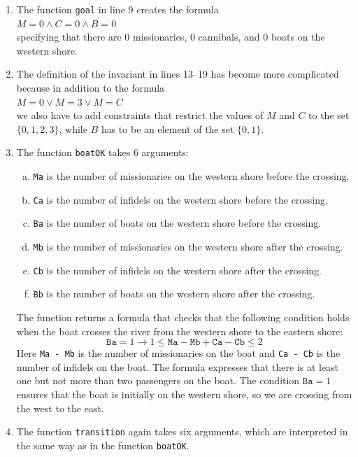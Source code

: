 \begin{enumerate}
      Note that we have to use the \texttt{Z3} function \texttt{And} to form the conjunction of the conditions.
      The function takes an arbitrary number of arguments.  The constraint solver \texttt{Z3} also provides the
      functions \texttt{Or} and \texttt{Implies}.  The function \texttt{Or} computes the disjunction of its
      arguments, while the function $\texttt{Implies}(A, B)$ represents the formula $A \rightarrow B$.
\item The function \texttt{goal} in line 9 creates the formula
      \\[0.2cm]
      \hspace*{1.3cm}
      $M = 0 \wedge C = 0 \wedge B = 0$
      \\[0.2cm]
      specifying that there are 0 missionaries, 0 cannibals, and 0 boats on the western shore.
\item The definition of the invariant in lines 13--19 has become more complicated because in addition to the
      formula 
      \\[0.2cm]
      \hspace*{1.3cm}
      $M = 0 \vee M = 3 \vee M = C$
      \\[0.2cm]
      we also have to add constraints that restrict the values of $M$ and $C$ to the set $\{0, 1, 2, 3\}$,
      while $B$ has to be an element of the set $\{0,1\}$.
\item The function \texttt{boatOK} takes 6 arguments:
      \begin{enumerate}[(a)]
      \item \texttt{Ma} is the number of missionaries on the western shore before the crossing.
      \item \texttt{Ca} is the number of infidels on the western shore before the crossing.
      \item \texttt{Ba} is the number of boats on the western shore before the crossing. 
      \item \texttt{Mb} is the number of missionaries on the western shore after the crossing.
      \item \texttt{Cb} is the number of infidels on the western shore after the crossing.
      \item \texttt{Bb} is the number of boats on the western shore after the crossing.
      \end{enumerate}

      The function returns a formula that checks that the following condition holds when the boat 
      crosses the river from the western shore to the eastern shore:
      $$ \mathtt{Ba} = 1 \rightarrow 1 \leq \mathtt{Ma} - \mathtt{Mb} + \mathtt{Ca} - \mathtt{Cb} \leq 2 $$
      Here \texttt{Ma - Mb} is the number of missionaries on the boat and  \texttt{Ca - Cb} is the number of
      infidels on the boat.  The formula expresses that there is at least one but not more than two passengers
      on the boat. 
      The condition $\texttt{Ba} = 1$ ensures that the boat is initially on the western shore, so we are
      crossing from the west to the east.
\item The function \texttt{transition} again takes six arguments, which are interpreted in the same way as
      in the function \texttt{boatOK}.


\end{enumerate}
